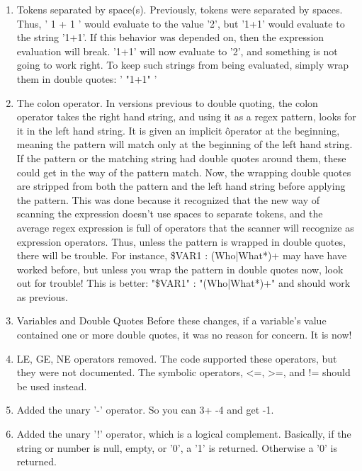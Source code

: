 \begin{enumerate}
\item Tokens separated by space(s).
   Previously, tokens were separated by spaces. Thus, ' 1 + 1 ' would evaluate
   to the value '2', but '1+1' would evaluate to the string '1+1'. If this
   behavior was depended on, then the expression evaluation will break. '1+1'
   will now evaluate to '2', and something is not going to work right.
   To keep such strings from being evaluated, simply wrap them in double 
   quotes: '  "1+1" '

\item The colon operator. In versions previous to double quoting, the
   colon operator takes the right hand string, and using it as a 
   regex pattern, looks for it in the left hand string. It is given
   an implicit \^ operator at the beginning, meaning the pattern 
   will match only at the beginning of the left hand string. 
   If the pattern or the matching string had double quotes around
   them, these could get in the way of the pattern match. Now,
   the wrapping double quotes are stripped from both the pattern 
   and the left hand string before applying the pattern. This
   was done because it recognized that the new way of
   scanning the expression doesn't use spaces to separate tokens,
   and the average regex expression is full of operators that 
   the scanner will recognize as expression operators. Thus, unless
   the pattern is wrapped in double quotes, there will be trouble.
   For instance,      \${VAR1} : (Who|What*)+
   may have have worked before, but unless you wrap the pattern
   in double quotes now, look out for trouble! This is better:
         "\${VAR1}" : "(Who|What*)+"
   and should work as previous.

\item Variables and Double Quotes
   Before these changes, if a variable's value contained one or more double
   quotes, it was no reason for concern. It is now!

\item LE, GE, NE operators removed. The code supported these operators,
   but they were not documented. The symbolic operators, <=, >=, and !=
   should be used instead.

\item  Added the unary '-' operator. So you can 3+ -4 and get -1.

\item  Added the unary '!' operator, which is a logical complement.
    Basically, if the string or number is null, empty, or '0',
    a '1' is returned. Otherwise a '0' is returned.


\end{enumerate}
